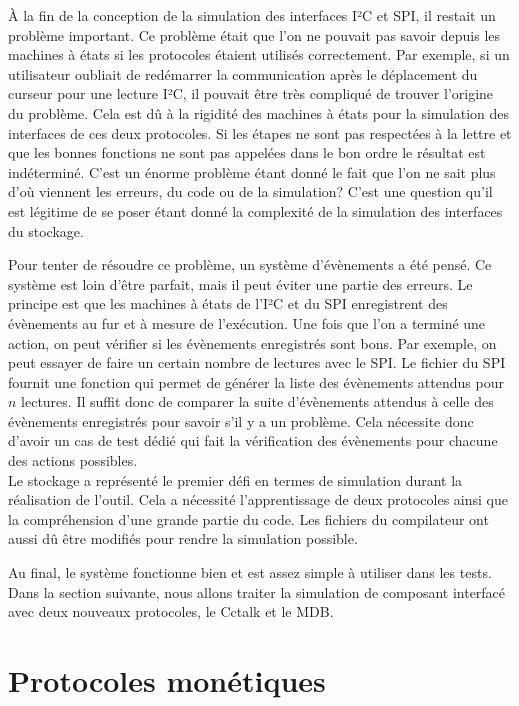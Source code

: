 \documentclass[a4paper]{article}
\begin{document}
À la fin de la conception de la simulation des interfaces I²C et SPI, il restait
un problème important. Ce problème était que l'on ne pouvait pas savoir depuis
les machines à états si les protocoles étaient utilisés correctement. Par
exemple, si un utilisateur oubliait de redémarrer la communication après le
déplacement du curseur pour une lecture I²C, il pouvait être très compliqué de
trouver l'origine du problème. Cela est dû à la rigidité des machines à états
pour la simulation des interfaces de ces deux protocoles. Si les étapes ne sont
pas respectées à la lettre et que les bonnes fonctions ne sont pas appelées
dans le bon ordre le résultat est indéterminé. C'est un énorme problème étant
donné le fait que l'on ne sait plus d'où viennent les erreurs, du code ou de la
simulation? C'est une question qu'il est légitime de se poser étant donné la
complexité de la simulation des interfaces du stockage.

Pour tenter de résoudre ce problème, un système d'évènements a été pensé. Ce
système est loin d'être parfait, mais il peut éviter une partie des erreurs. Le
principe est que les machines à états de l'I²C et du SPI enregistrent des
évènements au fur et à mesure de l'exécution. Une fois que l'on a terminé une
action, on peut vérifier si les évènements enregistrés sont bons. Par exemple, on
peut essayer de faire un certain nombre de lectures avec le SPI. Le fichier du
SPI fournit une fonction qui permet de générer la liste des évènements attendus
pour $n$ lectures. Il suffit donc de comparer la suite d'évènements attendus à
celle des évènements enregistrés pour savoir s'il y a un problème. Cela
nécessite donc d'avoir un cas de test dédié qui fait la vérification des
évènements pour chacune des actions possibles.
\\
Le stockage a représenté le premier défi en termes de simulation durant la
réalisation de l'outil. Cela a nécessité l'apprentissage de deux protocoles
ainsi que la compréhension d'une grande partie du code. Les fichiers du
compilateur ont aussi dû être modifiés pour rendre la simulation possible.

Au final, le système fonctionne bien et est assez simple à utiliser dans les
tests. Dans la section suivante, nous allons traiter la simulation de composant
interfacé avec deux nouveaux protocoles, le Cctalk et le MDB.
\section{Protocoles monétiques}%
\end{document}
